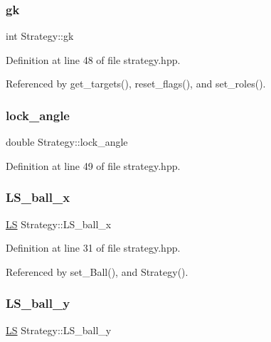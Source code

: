 \subsubsection{\texorpdfstring{gk}{gk}}
{\footnotesize\ttfamily int Strategy\+::gk}



Definition at line 48 of file strategy.\+hpp.



Referenced by get\+\_\+targets(), reset\+\_\+flags(), and set\+\_\+roles().

\mbox{\label{class_strategy_a4661aa884907a2c561ca5353aeb7cbed}} 
\subsubsection{\texorpdfstring{lock\+\_\+angle}{lock\_angle}}
{\footnotesize\ttfamily double Strategy\+::lock\+\_\+angle}



Definition at line 49 of file strategy.\+hpp.

\mbox{\label{class_strategy_ab9ecf12e9440d653dd732674b78ce02b}} 
\subsubsection{\texorpdfstring{L\+S\+\_\+ball\+\_\+x}{LS\_ball\_x}}
{\footnotesize\ttfamily \hyperlink{class_l_s}{LS} Strategy\+::\+L\+S\+\_\+ball\+\_\+x}



Definition at line 31 of file strategy.\+hpp.



Referenced by set\+\_\+\+Ball(), and Strategy().

\mbox{\label{class_strategy_aba301b4dd7bac24f2db4ca16c1f96608}} 
\subsubsection{\texorpdfstring{L\+S\+\_\+ball\+\_\+y}{LS\_ball\_y}}
{\footnotesize\ttfamily \hyperlink{class_l_s}{LS} Strategy\+::\+L\+S\+\_\+ball\+\_\+y}



